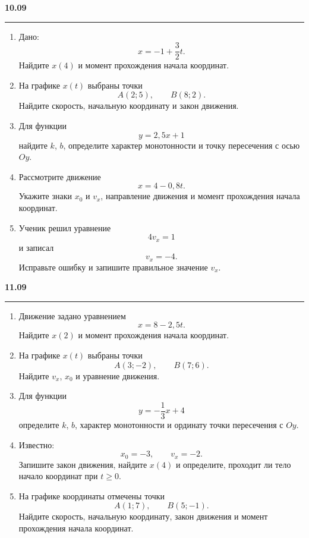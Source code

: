 \documentclass[a4paper,12pt]{article}
\newcommand{\daytitle}[1]{%
  \vspace{0.7em}
  {\large\bfseries\color{darkaccent}#1}\par
  \vspace{0.2em}
  \noindent\color{accent}\rule{\linewidth}{0.4pt}\color{textgray}
  \vspace{0.3em}
}
\begin{document}

\daytitle{10.09}

\begin{enumerate}[label=\arabic*),leftmargin=*,itemsep=0.9em]

\item Дано:
\[
x=-1+\frac32t.
\]
Найдите \(x(4)\) и момент прохождения начала координат.

\item На графике \(x(t)\) выбраны точки
\[
A(2;5),\qquad B(8;2).
\]
Найдите скорость, начальную координату и закон движения.

\item Для функции
\[
y=2{,}5x+1
\]
найдите \(k\), \(b\), определите характер монотонности и точку пересечения с осью \(Oy\).

\item Рассмотрите движение
\[
x=4-0{,}8t.
\]
Укажите знаки \(x_0\) и \(v_x\), направление движения и момент прохождения начала координат.

\item Ученик решил уравнение
\[
4v_x=1
\]
и записал
\[
v_x=-4.
\]
Исправьте ошибку и запишите правильное значение \(v_x\).

\end{enumerate}


\daytitle{11.09}

\begin{enumerate}[label=\arabic*),leftmargin=*,itemsep=0.9em]

\item Движение задано уравнением
\[
x=8-2{,}5t.
\]
Найдите \(x(2)\) и момент прохождения начала координат.

\item На графике \(x(t)\) выбраны точки
\[
A(3;-2),\qquad B(7;6).
\]
Найдите \(v_x\), \(x_0\) и уравнение движения.

\item Для функции
\[
y=-\frac13x+4
\]
определите \(k\), \(b\), характер монотонности и ординату точки пересечения с \(Oy\).

\item Известно:
\[
x_0=-3,\qquad v_x=-2.
\]
Запишите закон движения, найдите \(x(4)\) и определите, проходит ли тело начало координат при \(t\ge0\).

\item На графике координаты отмечены точки
\[
A(1;7),\qquad B(5;-1).
\]
Найдите скорость, начальную координату, закон движения и момент прохождения начала координат.

\end{enumerate}
\end{document}
